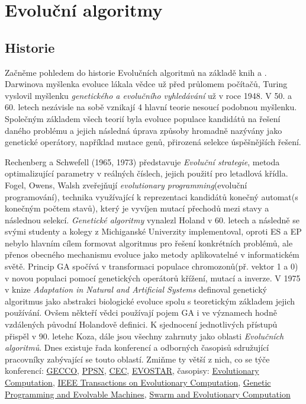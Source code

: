 \chapter{Evoluční algoritmy}
\section{Historie}
Začněme pohledem do historie Evolučních algoritmů na základě knih \citep{MitchellBook} a \citep{eibenIntro}. Darwinova myšlenka evoluce lákala vědce už před průlomem počítačů, Turing vyslovil myšlenku \textit{genetického a evolučního vyhledávání} už v roce 1948. V 50. a 60. letech nezávisle na sobě vznikají 4 hlavní teorie nesoucí podobnou myšlenku. Společným základem všech teorií byla evoluce populace kandidátů na řešení daného problému a jejich následná úprava způsoby hromadně nazývány jako genetické operátory, například mutace genů, přirozená selekce úspěšnějších řešení. \par 
Rechenberg a Schwefell (1965, 1973) představuje \textit{Evoluční strategie}, metoda optimalizující parametry v reálných číslech, jejich použití pro letadlová křídla. Fogel, Owens, Walsh zveřejňují \textit{evolutionary programming}(evoluční programování), technika využívající k reprezentaci kandidátů konečný automat(s konečným počtem stavů), který je vyvíjen mutací přechodů mezi stavy a následnou selekcí. \textit{Genetické algoritmy} vynalezl Holand v 60. letech a následně se svými studenty a kolegy z Michiganské Univerzity implementoval, oproti ES a EP nebylo hlavním cílem formovat algoritmus pro řešení konkrétních problémů, ale přenos obecného mechanismu evoluce jako metody aplikovatelné v informatickém světě. Princip GA spočívá v transformaci populace chromozonů(př. vektor 1 a 0) v novou populaci pomocí genetických operátorů křížení, mutací a inverze. V 1975 v knize \textit{Adaptation in Natural and  Artificial Systems} \citep{HolandBook} definoval genetický algoritmus jako abstrakci biologické evoluce spolu s teoretickým základem jejich používání. Ovšem někteří vědci používají pojem GA i ve významech hodně vzdálených původní Holandově definici. K sjednocení jednotlivých přístupů přispěl v 90. letehc Koza, dále jsou všechny zahrnuty jako oblasti \textit{Evolučních algoritmů}. Dnes existuje řada konferencí a odborných časopisů sdružující pracovníky zabývající se touto oblastí. Zmiňme ty větší z nich, co se týče konferencí: 
\href{http://gecco-2017.sigevo.org/index.html/HomePage}{GECCO}, \href{http://www.ppsn2016.org/conference}{PPSN}, 
\href{http://www.cec2017.org/}{CEC}, 
\href{http://www.evostar.org/2018/}{EVOSTAR}, 
časopisy: 
\href{http://www.mitpressjournals.org/loi/evco}{Evolutionary Computation}, 
\href{http://ieeexplore.ieee.org/xpl/RecentIssue.jsp?reload=true&punumber=4235}{IEEE Transactions on Evolutionary Computation}, 
\href{http://www.springer.com/computer/ai/journal/10710}{Genetic Programming and Evolvable Machines},
\href{https://www.journals.elsevier.com/swarm-and-evolutionary-computation/}{Swarm and Evolutionary Computation}
